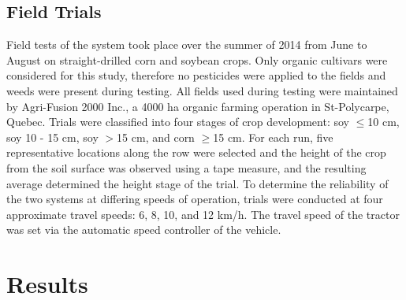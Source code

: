 \documentclass[authoryear]{elsarticle}
\begin{document}
\subsection{Field Trials}
Field tests of the system took place over the summer of 2014 from June
to August on straight-drilled corn and soybean crops. Only organic
cultivars were considered for this study, therefore no pesticides were
applied to the fields and weeds were present during testing. All
fields used during testing were maintained by Agri-Fusion 2000 Inc., a
4000 ha organic farming operation in St-Polycarpe, Quebec. Trials were
classified into four stages of crop development: soy $\le$10 cm, soy 10 - 15
cm, soy $>$15 cm, and corn $\ge$15 cm. For each run, five representative
locations along the row were selected and the height of the crop from
the soil surface was observed using a tape measure, and the resulting
average determined the height stage of the trial. To determine the
reliability of the two systems at differing speeds of operation,
trials were conducted at four approximate travel speeds: 6, 8, 10, and
12 km/h. The travel speed of the tractor was set via the automatic
speed controller of the vehicle.

\section{Results}
\end{document}
